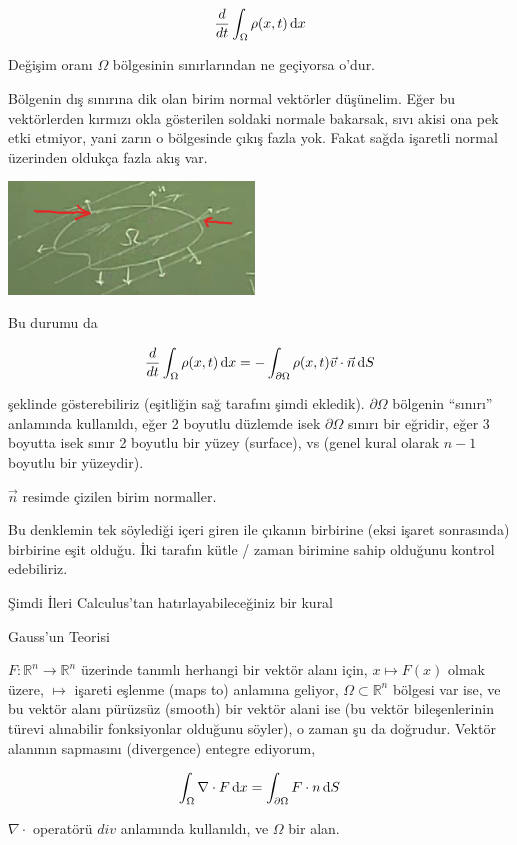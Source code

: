 \documentclass[12pt,fleqn]{article}\usepackage{../../common}
\begin{document}
$$ \frac{d}{dt} \int_\Omega \rho(x,t) \,\mathrm{d} x   $$

Değişim oranı $\Omega$ bölgesinin sınırlarından ne geçiyorsa o'dur. 

Bölgenin dış sınırına dik olan birim normal vektörler düşünelim. Eğer bu
vektörlerden kırmızı okla gösterilen soldaki normale bakarsak, sıvı akisi
ona pek etki etmiyor, yani zarın o bölgesinde çıkış fazla yok. Fakat sağda
işaretli normal üzerinden oldukça fazla akış var.

\includegraphics[height=3cm]{4_2.png}

Bu durumu da

$$ \frac{d}{dt} \int_\Omega \rho(x,t) \,\mathrm{d} x   = 
- \int_{\partial \Omega} \rho(x,t) \vec{v} \cdot \vec{n} \,\mathrm{d} S 
$$

şeklinde gösterebiliriz (eşitliğin sağ tarafını şimdi ekledik). $\partial
\Omega$ bölgenin ``sınırı'' anlamında kullanıldı, eğer 2 boyutlu düzlemde isek
$\partial \Omega$ sınırı bir eğridir, eğer 3 boyutta isek sınır 2 boyutlu bir
yüzey (surface), vs (genel kural olarak $n-1$ boyutlu bir yüzeydir).

$\vec{n}$ resimde çizilen birim normaller. 

Bu denklemin tek söylediği içeri giren ile çıkanın birbirine (eksi işaret
sonrasında) birbirine eşit olduğu. İki tarafın kütle / zaman birimine sahip
olduğunu kontrol edebiliriz. 

Şimdi İleri Calculus'tan hatırlayabileceğiniz bir kural 

Gauss'un Teorisi

$F: \mathbb{R}^n \to \mathbb{R}^n$ üzerinde tanımlı herhangi bir vektör alanı için,
$x \mapsto F(x)$ olmak üzere, $\mapsto$ işareti eşlenme (maps to) anlamına
geliyor, $\Omega \subset \mathbb{R}^n$ bölgesi var ise, ve bu vektör alanı
pürüzsüz (smooth) bir vektör alani ise (bu vektör bileşenlerinin
türevi alınabilir fonksiyonlar olduğunu söyler), o zaman şu da
doğrudur. Vektör alanının sapmasını (divergence) entegre ediyorum, 

$$ 
\int_\Omega \nabla \cdot F \,\mathrm{d} x =
\int_{\partial \Omega} F \cdot n \,\mathrm{d} S
$$

$\nabla \cdot$ operatörü $div$ anlamında kullanıldı, ve $\Omega$ bir alan. 
\end{document}
